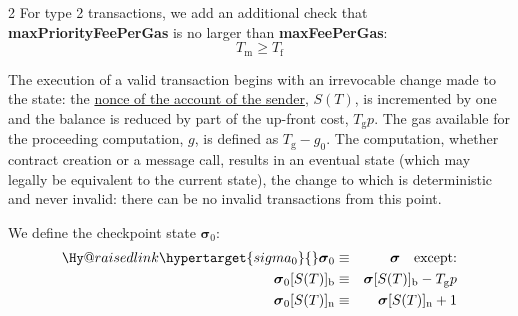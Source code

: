 \documentclass[9pt,oneside]{amsart}
\makeatletter
\newcommand{\linkdest}[1]{\Hy@raisedlink{\hypertarget{#1}{}}}
\makeatother
\begin{document}
\begin{multicols}{2}
For type 2 transactions, we add an additional check that \textbf{maxPriorityFeePerGas} is no larger than \textbf{maxFeePerGas}:
\begin{equation}
  T_{\mathrm{m}} \geqslant T_{\mathrm{f}}
\end{equation}

The execution of a valid transaction begins with an irrevocable change made to the state: the \hyperlink{account_nonce}{nonce of the account of the sender}, $S(T)$, is incremented by one and the balance is reduced by part of the up-front cost, $T_{\mathrm{g}} p$. The gas available for the proceeding computation, $g$, is defined as $T_{\mathrm{g}} - g_0$. The computation, whether contract creation or a message call, results in an eventual state (which may legally be equivalent to the current state), the change to which is deterministic and never invalid: there can be no invalid transactions from this point.

We define the checkpoint state $\boldsymbol{\sigma}_0$:
\begin{eqnarray}
\linkdest{sigma_0}{}\boldsymbol{\sigma}_0 & \equiv & \boldsymbol{\sigma} \quad \text{except:} \\
\boldsymbol{\sigma}_0[S(T)]_{\mathrm{b}} & \equiv & \boldsymbol{\sigma}[S(T)]_{\mathrm{b}} - T_{\mathrm{g}} p \\
\boldsymbol{\sigma}_0[S(T)]_{\mathrm{n}} & \equiv & \boldsymbol{\sigma}[S(T)]_{\mathrm{n}} + 1
\end{eqnarray}


\end{multicols}
\end{document}
